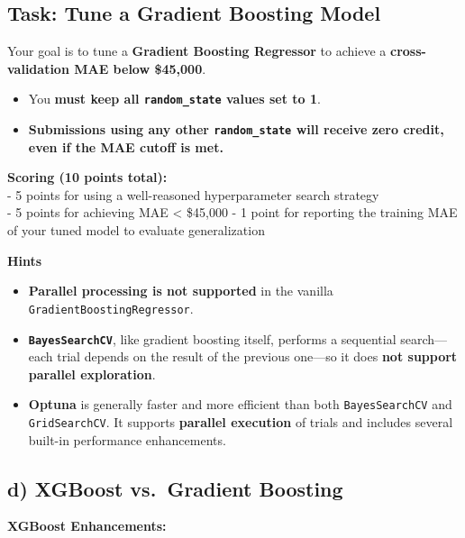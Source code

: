 \documentclass[
  letterpaper,
  DIV=11,
  numbers=noendperiod]{scrreprt}
\providecommand{\tightlist}{%
  \setlength{\itemsep}{0pt}\setlength{\parskip}{0pt}}\usepackage{longtable,booktabs,array}
\begin{document}
\subsection{Task: Tune a Gradient Boosting
Model}\label{task-tune-a-gradient-boosting-model}

Your goal is to tune a \textbf{Gradient Boosting Regressor} to achieve a
\textbf{cross-validation MAE below \$45,000}.

\begin{itemize}
\tightlist
\item
  You \textbf{must keep all \texttt{random\_state} values set to 1}.\\
\item
  \textbf{Submissions using any other \texttt{random\_state} will
  receive zero credit, even if the MAE cutoff is met.}
\end{itemize}

\textbf{Scoring (10 points total):}\\
- 5 points for using a well-reasoned hyperparameter search strategy\\
- 5 points for achieving MAE \textless{} \$45,000 - 1 point for
reporting the training MAE of your tuned model to evaluate
generalization

\textbf{Hints}

\begin{itemize}
\tightlist
\item
  \textbf{Parallel processing is not supported} in the vanilla
  \texttt{GradientBoostingRegressor}.
\item
  \textbf{\texttt{BayesSearchCV}}, like gradient boosting itself,
  performs a sequential search---each trial depends on the result of the
  previous one---so it does \textbf{not support parallel exploration}.
\item
  \textbf{Optuna} is generally faster and more efficient than both
  \texttt{BayesSearchCV} and \texttt{GridSearchCV}. It supports
  \textbf{parallel execution} of trials and includes several built-in
  performance enhancements.
\end{itemize}

\subsection{d) XGBoost vs.~Gradient
Boosting}\label{d-xgboost-vs.-gradient-boosting}

\textbf{XGBoost Enhancements:}
\end{document}
